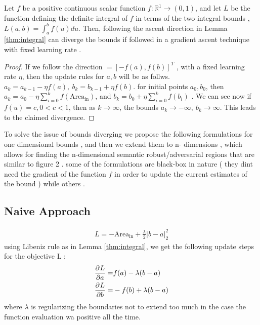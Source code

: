 \begin{theorem} \label{thm:unbounded}
Let $f$ be a positive continuous scalar function $f: \mathbb{R}^{1} \rightarrow (0,1) $, and let $L$ be the function defining the definite integral of $f$ in terms of the two integral bounds , \ie $L(a,b) = \int_{a}^{b}f(u)du$. Then, following the ascent direction in Lemma \ref{thm:integral} can diverge the bounds if followed in a gradient ascent technique with fixed learning rate  . 
\end{theorem}
\begin{proof}
If we follow the direction $= [-f(a), f(b)]^{T}$ , with a fixed learning rate $\eta$, then the update rules for $a,b$ will be as follws. $a_{k} = a_{k-1} - \eta f(a) , ~ b_{k} = b_{k-1} + \eta f(b) $. for initial points $a_{0},b_{0}$, then $a_{k}= a_{0} - \eta \sum_{i=0}^{k}f(\text{Area}_{\text{in}})$, and $b_{k}= b_{0} + \eta \sum_{i=0}^{k}f(b_{i})$ . We can see now if $f(u) = c, 0<c<1$, then as $k \rightarrow \infty$, the bounds $a_{k} \rightarrow - \infty, ~ b_{k} \rightarrow \infty$. This leads to the claimed divergence. 
\end{proof} \vspace{-8pt}
To solve the issue of bounds diverging we propose the following formulations for one dimensional bounds , and then we extend them to n- dimensions , which allows for finding the n-dimensional semantic robust/adversarial regions that are similar to figure 2 . some of the formulations are black-box in nature ( they dint need the gradient of the function $f $ in order to update the current estimates of the bound ) while others  . 

\subsection{Naive Approach} 
\begin{equation}
\begin{aligned} 
L = -\text{Area}_{\text{in}} + \frac{\lambda}{2} \left| b-a\right|_{2}^{2}
\label{eq:loss-naive-sup}
\end{aligned}
\end{equation}
using Libeniz rule as in Lemma \ref{thm:integral}, we get the following update steps for the objective L :
\begin{equation}
\begin{aligned} 
\frac{\partial^{} L}{\partial a} =& f(a) - \lambda (b-a)\\
\frac{\partial^{} L}{\partial b} =& - f(b) + \lambda (b-a)
\label{eq:update-naive-1-sup}
\end{aligned}
\end{equation}
where $\lambda$ is regularizing the boundaries not to extend too much in the case the function evaluation wa positive all the time.

